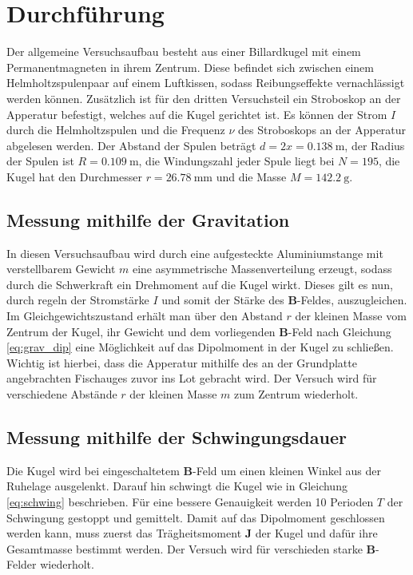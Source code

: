 \section{Durchführung}
\label{sec:Durchführung}
Der allgemeine Versuchsaufbau besteht aus einer Billardkugel mit einem Permanentmagneten in ihrem Zentrum.
Diese befindet sich zwischen einem Helmholtzspulenpaar auf einem Luftkissen, sodass Reibungseffekte vernachlässigt werden können.
Zusätzlich ist für den dritten Versuchsteil ein Stroboskop an der Apperatur befestigt, welches auf die Kugel gerichtet ist.
Es können der Strom $I$ durch die Helmholtzspulen und die Frequenz $\nu$ des Stroboskops an der Apperatur abgelesen werden.
Der Abstand der Spulen beträgt \mbox{$d=2x=\SI{0.138}{\meter}$}, der Radius der Spulen ist $R=\SI{0.109}{\meter}$, 
die Windungszahl jeder Spule liegt bei $N=\num{195}$, die Kugel hat den Durchmesser $r=\SI{26.78}{\milli\meter}$ und die Masse $M=\SI{142.2}{\gram}$.
%
\subsection{Messung mithilfe der Gravitation}
In diesen Versuchsaufbau wird durch eine aufgesteckte Aluminiumstange mit verstellbarem Gewicht $m$ eine asymmetrische Massenverteilung erzeugt, 
sodass durch die Schwerkraft ein Drehmoment auf die Kugel wirkt.
Dieses gilt es nun, durch regeln der Stromstärke $I$ und somit der Stärke des $\symbf{B}$-Feldes, auszugleichen.
Im Gleichgewichtszustand
erhält man über den Abstand $r$ der kleinen Masse vom Zentrum der Kugel, ihr Gewicht und dem vorliegenden $\symbf{B}$-Feld 
nach Gleichung \eqref{eq:grav_dip} eine Möglichkeit auf das Dipolmoment in der Kugel zu schließen.
Wichtig ist hierbei, dass die Apperatur mithilfe des an der Grundplatte angebrachten Fischauges zuvor ins Lot gebracht wird.
Der Versuch wird für verschiedene Abstände $r$ der kleinen Masse $m$ zum Zentrum wiederholt.
%
\subsection{Messung mithilfe der Schwingungsdauer}
Die Kugel wird bei eingeschaltetem $\symbf{B}$-Feld um einen kleinen Winkel aus der Ruhelage ausgelenkt.
Darauf hin schwingt die Kugel wie in Gleichung \eqref{eq:schwing} beschrieben.
Für eine bessere Genauigkeit werden 10 Perioden $T$ der Schwingung gestoppt und gemittelt.
Damit auf das Dipolmoment geschlossen werden kann, muss zuerst das Trägheitsmoment $\symbf{J}$ der Kugel und dafür ihre Gesamtmasse bestimmt werden.
Der Versuch wird für verschieden starke $\symbf{B}$-Felder wiederholt.
%
